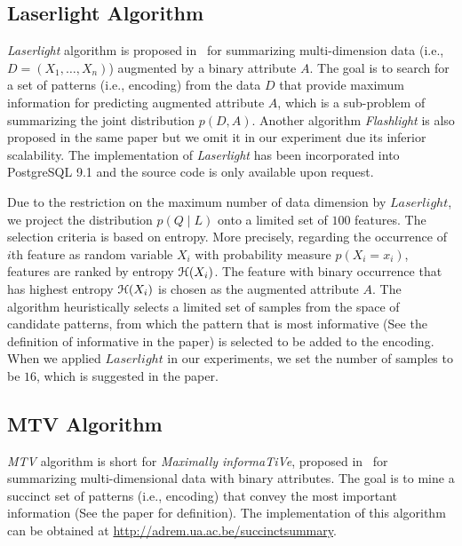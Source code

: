 \begin{appendices}
\subsection{Laserlight Algorithm}
\label{appendix:Laserlight}
\textit{Laserlight} algorithm is proposed in~\cite{ElGebaly:2014:IIE:2735461.2735467} for summarizing multi-dimension data (i.e., $D=(X_1,\ldots,X_n)$) augmented by a binary attribute $A$. 
The goal is to search for a set of patterns (i.e., encoding) from the data $D$ that provide maximum information for predicting augmented attribute $A$, which is a sub-problem of summarizing the joint distribution $p(D,A)$. 
Another algorithm \textit{Flashlight} is also proposed in the same paper but we omit it in our experiment due its inferior scalability.
The implementation of \textit{Laserlight} has been incorporated into PostgreSQL 9.1 and the source code is only available upon request.

Due to the restriction on the maximum number of data dimension by $Laserlight$, we project the distribution $p(Q\;|\;L)$ onto a limited set of $100$ features.
The selection criteria is based on entropy. 
More precisely, regarding the occurrence of $i$th feature as random variable $X_i$ with probability measure $p(X_i=x_i)$, features are ranked by entropy $\mathcal{H}(X_i)$. 
The feature with binary occurrence that has highest entropy $\mathcal{H}(X_i)$ is chosen as the augmented attribute $A$.
The algorithm heuristically selects a limited set of samples from the space of candidate patterns, from which the pattern that is most informative (See the definition of informative in the paper) is selected to be added to the encoding.
When we applied $Laserlight$ in our experiments, we set the number of samples to be $16$, which is suggested in the paper.

\subsection{MTV Algorithm}
\textit{MTV} algorithm is short for \textit{Maximally informaTiVe}, proposed in~\cite{Mampaey:2012:SDS:2382577.2382580} for summarizing multi-dimensional data with binary attributes. 
The goal is to mine a succinct set of patterns (i.e., encoding) that convey the most important information (See the paper for definition). 
The implementation of this algorithm can be obtained at \href{http://adrem.ua.ac.be/succinctsummary}{http://adrem.ua.ac.be/succinctsummary}.


\end{appendices}
